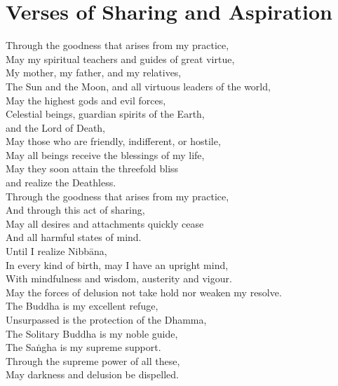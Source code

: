\section{Verses of Sharing and Aspiration}

\begin{leader}
\end{leader}


Through the goodness that arises from my practice,\\
May my spiritual teachers and guides of great virtue,\\
My mother, my father, and my relatives,\\
The Sun and the Moon, and all virtuous leaders of the world,\\
May the highest gods and evil forces,\\
Celestial beings, guardian spirits of the Earth,\\\vin and the Lord of Death,\\
May those who are friendly, indifferent, or hostile,\\
May all beings receive the blessings of my life,\\
May they soon attain the threefold bliss\\\vin and realize the Deathless.\\
Through the goodness that arises from my practice,\\
And through this act of sharing,\\
May all desires and attachments quickly cease\\
And all harmful states of mind.\\
Until I realize Nibbāna,\\
In every kind of birth, may I have an upright mind,\\
With mindfulness and wisdom, austerity and vigour.\\
May the forces of delusion not take hold nor weaken my resolve.\\
The Buddha is my excellent refuge,\\
Unsurpassed is the protection of the Dhamma,\\
The Solitary Buddha is my noble guide,\\
The Saṅgha is my supreme support.\\
Through the supreme power of all these,\\
May darkness and delusion be dispelled.

